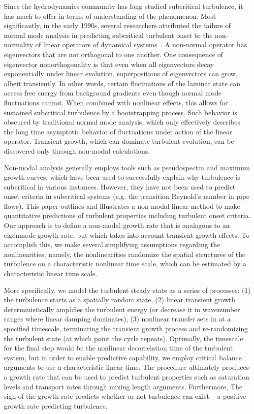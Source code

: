 \documentclass[letter,scriptaddress,twocolumn, prl,showkeys]{revtex4}
\begin{document}
Since the hydrodynamics community has long studied subcritical turbulence, it has much to offer in terms of understanding of the phenomenon. Most significantly,
in the early 1990s, several researchers attributed the failure of normal mode analysis in predicting subcritical turbulent onset to the non-normality of linear operators of
dynamical systems~\cite{gustavsson1991,butler1992,trefethen1993,reddy1993,henningson1994,schmid2007}. A non-normal operator has 
eigenvectors that are not orthogonal to one another. One consequence of eigenvector nonorthogonality is that even when all eigenvectors decay exponentially under linear evolution, 
superpositions of eigenvectors can grow, albeit transiently.
In other words, certain fluctuations of the laminar state can access free energy from background gradients even though normal mode fluctuations cannot.
When combined with nonlinear effects, this allows for sustained subcritical turbulence by a bootstrapping process.
Such behavior is obscured by traditional normal mode analysis, which only effectively describes the long time asymptotic behavior of fluctuations under  
action of the linear operator. Transient growth, which can dominate turbulent evolution, can be discovered only through non-modal calculations.

Non-modal analysis generally employs tools such as pseudospectra and maximum growth curves, which have been used to successfully explain why turbulence is subcritical in various instances. 
However, they have not been used to predict onset criteria in subcritical systems (e.g. the transition Reynold's number in pipe flows).
This paper outlines and illustrates a non-modal linear method to make quantitative predictions of turbulent properties including turbulent onset criteria. 
Our approach is to define a non-modal growth rate that is analagous to an eigenmode growth rate, but which takes into account transient growth effects. To accomplish this, we make
several simplifying assumptions regarding the nonlinearities; namely, the nonlinearities randomize the spatial structures of the turbulence on a characteristic nonlinear time scale, which can
be estimated by a characteristic linear time scale.

More specifically, we model the turbulent steady state as a series of processes:  (1) the turbulence starts as a spatially random state, 
(2) linear transient growth deterministically amplifies the turbulent energy (or decrease it in wavenumber ranges where linear damping dominates), 
(3) nonlinear transfer sets in at a specified timescale, terminating the transient growth process and re-randomizing the turbulent state (at which point the cycle repeats). 
Optimally, the timescale for the final step would be the nonlinear decorrelation time of the turbulent system, but in order to enable predictive capability, we employ critical balance
arguments to use a characteristic linear time. The procedure ultimately produces a growth rate that can be used to predict turbulent properties such as saturation levels and transport rates 
through mixing length arguments. Furthermore, The sign of the growth rate predicts whether or not turbulence can exist -- a positive growth rate predicting turbulence.
\end{document}
